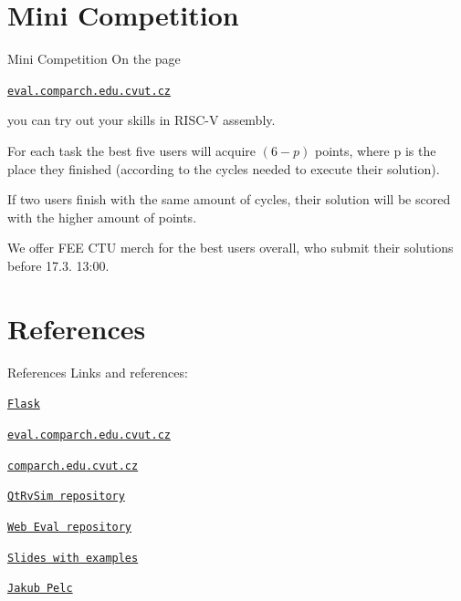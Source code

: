 \documentclass{beamer}
\begin{document}
	\section{Mini Competition}

	\begin{frame}{Mini Competition}
		On the page \par
		{\centering \texttt{\href{http://eval.comparch.edu.cvut.cz}{eval.comparch.edu.cvut.cz}} \par}
		you can try out your skills in RISC-V assembly. \par

		For each task the best five users will acquire $(6 - p)$ points, where p is the place they finished (according to the cycles needed to execute their solution).\par
		
		If two users finish with the same amount of cycles, their solution will be scored with the higher amount of points. \par

		We offer FEE CTU merch for the best users overall, who submit their solutions before 17.3. 13:00. \par
	\end{frame}

	\section{References}

	\begin{frame}{References}
		Links and references: \par
		{\centering \texttt{\href{https://flask.palletsprojects.com/en/3.0.x/}{Flask}} \par}
		{\centering \texttt{\href{http://eval.comparch.edu.cvut.cz}{eval.comparch.edu.cvut.cz}} \par}
		{\centering \texttt{\href{http://comparch.edu.cvut.cz}{comparch.edu.cvut.cz}} \par}
		{\centering \texttt{\href{https://github.com/cvut/qtrvsim}{QtRvSim repository}} \par}
		{\centering \texttt{\href{https://gitlab.fel.cvut.cz/b35apo/qtrvsim-eval-web}{Web Eval repository}} \par}
		{\centering \texttt{\href{https://github.com/kubakubakuba/if24-flask-web-eval}{Slides with examples}} \par}
		{\centering \texttt{\href{https://swpelc.eu}{Jakub Pelc}} \par}
	\end{frame}
\end{document}
